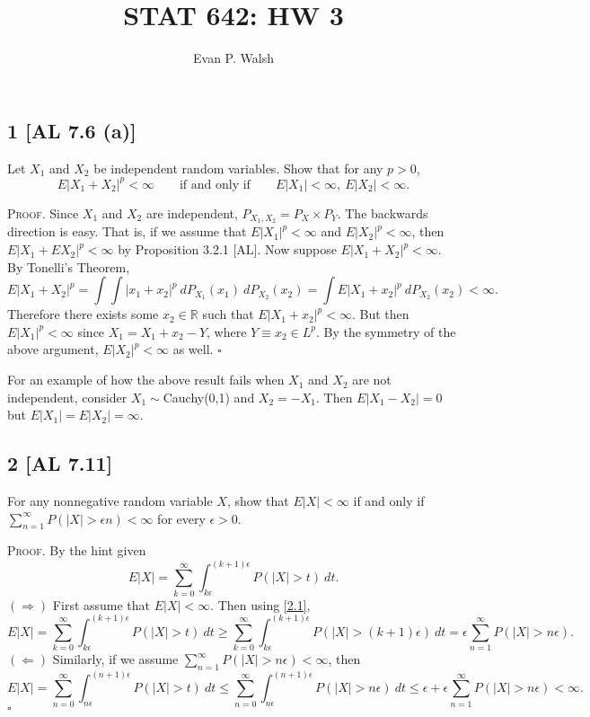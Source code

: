 \documentclass[12pt]{article}
\title{STAT 642: HW 3}
\author{Evan P. Walsh}
\newcounter{ProofCounter}
\newenvironment{Proof}{\stepcounter{ProofCounter}\textsc{Proof.}}{\hfill$\square$}
\begin{document}
\maketitle

\subsection*{1 [AL 7.6 (a)]}
\begin{tcolorbox}
Let $X_{1}$ and $X_{2}$ be independent random variables. Show that for any $p > 0$,
\[ E|X_{1} + X_{2}|^{p} < \infty \qquad \text{if and only if} \qquad E|X_{1}| < \infty,\  E|X_{2}| < \infty. \]
\end{tcolorbox}
\begin{Proof}
Since $X_{1}$ and $X_{2}$ are independent, $P_{X_{1},X_{2}} = P_{X}\times P_{Y}$. The backwards direction is easy. That is, if we assume that
$E|X_{1}|^{p} < \infty$ and $E|X_{2}|^p < \infty$, then $E|X_{1} + EX_{2}|^{p} < \infty$ by Proposition 3.2.1 [AL]. Now suppose $E|X_{1} + X_{2}|^{p}
< \infty$. By Tonelli's Theorem,
\[ E|X_{1} + X_{2}|^{p} = \int \int |x_{1} + x_{2}|^{p}\ dP_{X_{1}}(x_{1})\ dP_{X_{2}}(x_{2}) = \int E|X_{1} + x_{2}|^{p} \ dP_{X_{2}}(x_{2}) < \infty. \]
Therefore there exists some $x_{2} \in \mathbb{R}$ such that $E|X_{1} + x_{2}|^{p} < \infty$. But then $E|X_{1}|^{p} < \infty$ since $X_{1} = 
X_{1} + x_{2} - Y$, where $Y \equiv x_{2} \in L^{p}$. By the symmetry of the
above argument, $E|X_{2}|^{p} < \infty$ as well.
\end{Proof}

For an example of how the above result fails when $X_{1}$ and $X_{2}$ are not independent, consider $X_{1} \sim $Cauchy(0,1) and $X_{2} = -X_{1}$. Then
$E|X_{1} - X_{2}| = 0$ but $E|X_{1}| = E|X_{2}| = \infty$.


\subsection*{2 [AL 7.11]}
\begin{tcolorbox}
For any nonnegative random variable $X$, show that $E|X| < \infty$ if and only if $\sum_{n=1}^{\infty}P(|X| > \epsilon n) < \infty$ for every
$\epsilon > 0$.
\end{tcolorbox}
\begin{Proof}
By the hint given
\begin{equation}
E|X| = \sum_{k=0}^{\infty}\int_{k\epsilon}^{(k+1)\epsilon}P(|X| > t)\ dt.
\label{2.1}
\end{equation}
$(\Rightarrow)$ First assume that $E|X| < \infty$. Then using \eqref{2.1},
\[ E|X| = \sum_{k=0}^{\infty}\int_{k\epsilon}^{(k+1)\epsilon}P(|X| > t)\ dt \geq \sum_{k=0}^{\infty}\int_{k\epsilon}^{(k+1)\epsilon}P(|X| >
(k+1)\epsilon)\ dt = \epsilon\sum_{n=1}^{\infty}P(|X| > n\epsilon). \]
$(\Leftarrow)$ Similarly, if we assume $\sum_{n=1}^{\infty}P(|X| > n\epsilon) < \infty$, then 
\[ E|X| = \sum_{n=0}^{\infty}\int_{n\epsilon}^{(n+1)\epsilon}P(|X| > t)\ dt \leq \sum_{n=0}^{\infty}\int_{n\epsilon}^{(n+1)\epsilon}P(|X| >
n\epsilon)\ dt \leq \epsilon + \epsilon\sum_{n=1}^{\infty}P(|X| > n\epsilon) < \infty. \]
\end{Proof}
\end{document}
